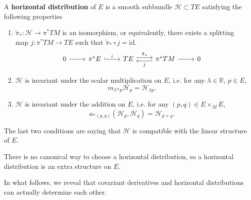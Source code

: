 \begin{definition}
    A \textbf{horizontal distribution} of $E$ is a smooth subbundle $\mathcal{H}\subset TE$ 
    satisfying the following properties 
    \begin{enumerate}
        \item $\tilde{\pi}_*: \mathcal{H} \to \pi^* TM$ is an isomorphism, or equivalently, 
        there exists a splitting map $j: \pi^* TM \to TE$ such that $\tilde{\pi}_* \circ j = \mathrm{id}$.
        \[\begin{tikzcd}
            0 & {\pi^*E} & TE & {\pi^*TM} & 0
            \arrow[from=1-1, to=1-2]
            \arrow["i", hook, from=1-2, to=1-3]
            \arrow["\tilde{\pi}_*", shift left, from=1-3, to=1-4]
            \arrow["j", shift left, from=1-4, to=1-3]
            \arrow[from=1-4, to=1-5]
        \end{tikzcd}\]
        \item $\mathcal{H}$ is invariant under the scalar multiplication on $E$, i.e. for any $\lambda\in \mathbb{R},\,p\in E$,
        \begin{equation*}
            m_{\lambda}{}_*{}_p \mathcal{H}_p = \mathcal{H}_{\lambda p}. 
        \end{equation*}
        \item $\mathcal{H}$ is invariant under the addition on $E$, i.e. for any $(p,q)\in E\times_M E$,
        \begin{equation*}
            a_*{}_{(p,q)}(\mathcal{H}_p,\mathcal{H}_q) = \mathcal{H}_{p+q}.
        \end{equation*} 
    \end{enumerate}
    The last two conditions are saying that $\mathcal{H}$ is compatible with the linear structure of $E$.
\end{definition}

There is no canonical way to choose a horizontal distribution, so a horizontal distribution is an extra structure on $E$.

In what follows, we reveal that covariant derivatives and horizontal distributions can actually determine each other.

